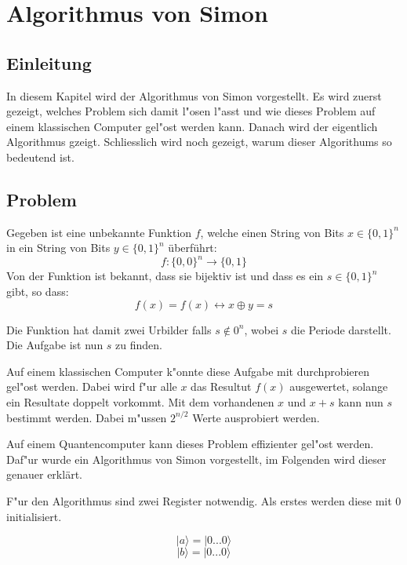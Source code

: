 \chapter{Algorithmus von Simon\label{chapter:simon}} 
\begin{refsection} 

\section{Einleitung} 

In diesem Kapitel wird der Algorithmus von Simon vorgestellt.  Es wird zuerst
gezeigt, welches Problem sich damit l"osen l"asst und wie dieses Problem auf
einem klassischen Computer gel"ost werden kann. Danach wird der eigentlich
Algorithmus gzeigt. Schliesslich wird noch gezeigt, warum dieser Algorithums so
bedeutend ist.

\section{Problem} 

Gegeben ist eine unbekannte Funktion $f$, welche einen String
von Bits $x\in\{0,1\}^n$ in ein String von Bits $y\in\{0,1\}^n$ \"uberführt:
\[
    f\colon\{0,0\}^n\to\{0,1\} 
\]
Von der Funktion ist bekannt, dass sie bijektiv ist und dass es ein
$s\in\{0,1\}^n$ gibt, so dass: \[ f(x) = f(x) \leftrightarrow x \oplus y = s \]

Die Funktion hat damit zwei Urbilder falls $s \notin 0^n$, wobei $s$ die
Periode darstellt. Die Aufgabe ist nun $s$ zu finden.

Auf einem klassischen Computer k"onnte diese Aufgabe mit durchprobieren gel"ost
werden. Dabei wird f"ur alle $x$ das Resultut $f(x)$ ausgewertet, solange ein
Resultate doppelt vorkommt. Mit dem vorhandenen $x$ und $x + s$ kann nun $s$
bestimmt werden. Dabei m"ussen $2^{n/2}$ Werte ausprobiert werden.

 Auf einem Quantencomputer kann dieses Problem effizienter gel"ost werden.
Daf"ur wurde ein Algorithmus von Simon vorgestellt, im Folgenden wird dieser
genauer erklärt.


F"ur den Algorithmus sind zwei Register notwendig. Als erstes werden diese mit
0 initialisiert.

\[ 
    |a\rangle=|0 ... 0 \rangle 
\]
\[
    |b\rangle=|0 ... 0 \rangle 
\]


\end{refsection}
